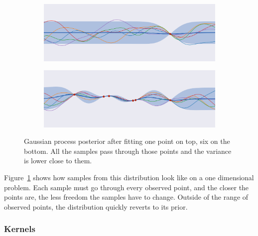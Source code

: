 \begin{figure}[htb]
    \centering
    \begin{subfigure}[b]{\textwidth}
        \includegraphics[width=\textwidth]{img_hyperopt/gp_posterior_1_point}
    \end{subfigure}

    \begin{subfigure}[b]{\textwidth}
        \includegraphics[width=\textwidth]{img_hyperopt/gp_posterior_6_point}
    \end{subfigure}
    \caption[Gaussian process posterior]{Gaussian process posterior after fitting one point on top, six on the bottom. All the samples pass through those points and the variance is lower close to them.}
    \label{fig:gp_posterior}
\end{figure}

Figure~\ref{fig:gp_posterior} shows how samples from this distribution look like on a one dimensional problem. Each sample must go through every observed point, and the closer the points are, the less freedom the samples have to change. Outside of the range of observed points, the distribution quickly reverts to its prior. 


\subsubsection{Kernels}

